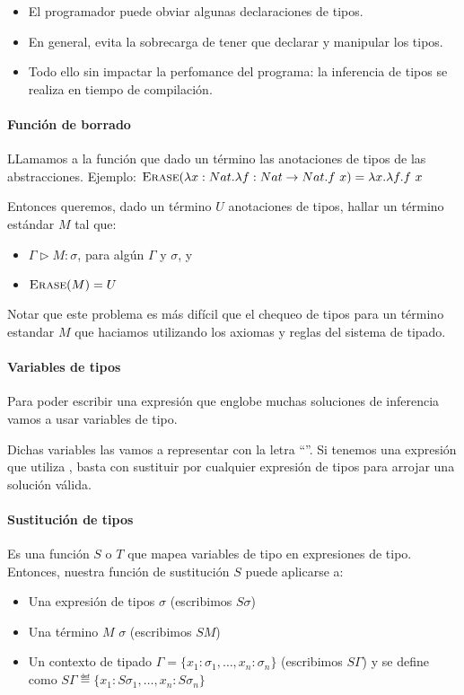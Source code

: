 \begin{itemize}
  \item El programador puede obviar algunas declaraciones de tipos.
  \item En general, evita la sobrecarga de tener que declarar y manipular  los tipos.
  \item Todo ello sin impactar la perfomance del programa: la inferencia de tipos se realiza en tiempo de compilación.
\end{itemize}

\paragraph{Función de borrado}

LLamamos \erase{\cdot} a la función que dado un término  las anotaciones de tipos de las abstracciones. Ejemplo: $\textsc{Erase}(\lambda x:Nat.\lambda f:Nat\to Nat.f\ x) = \lambda x.\lambda f.f\ x$

Entonces queremos, dado un término $U$  anotaciones de tipos, hallar un término estándar $M$ tal que:
\begin{itemize}
  \item $\Gamma \rhd M : \sigma$, para algún $\Gamma$ y $\sigma$, y
  \item $\textsc{Erase}(M) = U$
\end{itemize}

Notar que este problema es más difícil que el chequeo de tipos para un término estandar $M$ que haciamos utilizando los axiomas y reglas del sistema de tipado.

\paragraph{Variables de tipos}

Para poder escribir una  expresión que englobe muchas soluciones de inferencia vamos a usar variables de tipo.

Dichas variables las vamos a representar con la letra ``''. Si tenemos una expresión que utiliza , basta con sustituir  por cualquier expresión de tipos para arrojar una solución válida.

\paragraph{Sustitución de tipos}

Es una función $S$ o $T$ que mapea variables de tipo en expresiones de tipo. Entonces, nuestra función de sustitución $S$ puede aplicarse a:
\begin{itemize}
  \item Una expresión de tipos $\sigma$ (escribimos $S\sigma$)
  \item Una término $M$ $\sigma$ (escribimos $SM$)
  \item Un contexto de tipado  $\Gamma = \{x_1:\sigma_1,\dots,x_n:\sigma_n\}$ (escribimos $S\Gamma$) y se define como $S\Gamma \eqdef \{x_1:S\sigma_1,\dots,x_n:S\sigma_n\}$
\end{itemize}

